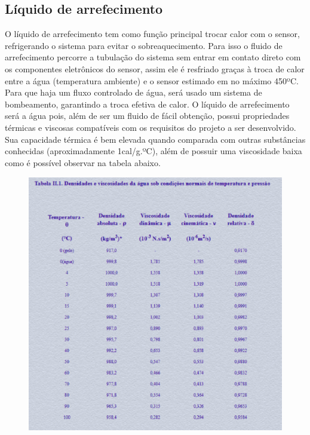 \subsection{Líquido de arrefecimento}

O líquido de arrefecimento tem como função principal trocar calor com o sensor, refrigerando o sistema para evitar o sobreaquecimento.
Para isso o fluido de arrefecimento percorre a tubulação do sistema sem entrar em contato direto com os componentes eletrônicos do sensor, assim ele é resfriado graças à troca de calor entre a água (temperatura ambiente) e o sensor estimado em no máximo 450ºC.  Para que haja um fluxo controlado de água, será usado um sistema de bombeamento, garantindo a troca efetiva de calor.
O líquido de arrefecimento será a água pois, além de ser um fluido de fácil obtenção, possui propriedades térmicas e viscosas compatíveis com os requisitos do projeto a ser desenvolvido.
Sua capacidade térmica é bem elevada quando comparada com outras substâncias conhecidas (aproximadamente 1cal/g.ºC), além de possuir uma viscosidade baixa como é possível observar na tabela abaixo.

\newpage

\begin{figure}[!htb]                                                               
   \centering                                                                      
   \includegraphics[scale=0.8, keepaspectratio=true]{figuras/tabelaagua.eps}               
\end{figure}


